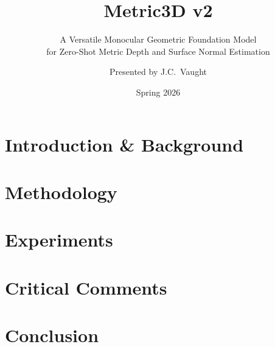 \documentclass[aspectratio=169]{beamer}
\title{\textcolor{garnet}{\textbf{Metric3D v2}}}
\subtitle{A Versatile Monocular Geometric Foundation Model\\for Zero-Shot Metric Depth and Surface Normal Estimation}
\author{Presented by J.C.\ Vaught}
\institute{CSCE 763 --- Digital Image Processing\\University of South Carolina}
\date{Spring 2026}
\begin{document}


\section{Introduction \& Background}





\section{Methodology}









\section{Experiments}




\section{Critical Comments}



\section{Conclusion}

\end{document}
